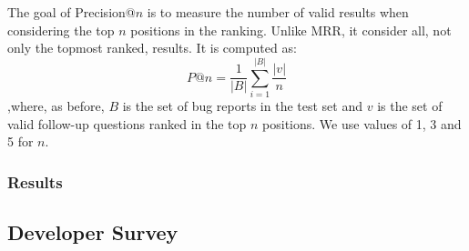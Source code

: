 The goal of Precision@$n$ is to measure the number of valid results when considering the top $n$ positions in the ranking. Unlike MRR, it consider all, not only the topmost ranked, results. It is computed as: $$P@n = \frac{1}{|B|} \sum_{i=1}^{|B|} \frac{|v|}{n}$$ ,where, as before, $B$ is the set of bug reports in the test set and $v$ is the set of valid follow-up questions ranked in the top $n$ positions. We use values of 1, 3 and 5 for $n$.

\subsubsection{Results}


\subsection{Developer Survey}
